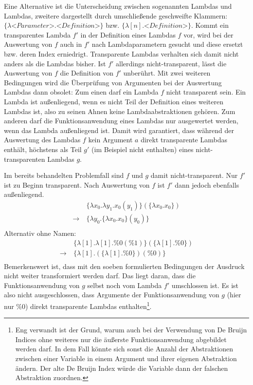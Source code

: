  Eine Alternative ist die Unterscheidung zwischen sogenannten  Lambdas und  Lambdas, zweitere dargestellt durch umschließende geschweifte Klammern: $\{\lambda \textit{<Parameter>}.\textit{<Definition>}\}$ bzw. $\{\lambda [n].\textit{<Definition>}\}$. Kommt ein transparentes Lambda $f'$ in der Definition eines Lambdas $f$ vor, wird bei der Auswertung von $f$ auch in $f'$ nach Lambdaparametern gesucht und diese ersetzt bzw. deren Index erniedrigt. Transparente Lambdas verhalten sich damit nicht anders als die Lambdas bisher. Ist $f'$ allerdings nicht-transparent, lässt die Auswertung von $f$ die Definition von $f'$ unberührt. 
 Mit zwei weiteren Bedingungen wird die Überprüfung von Argumenten bei der Auswertung Lambdas dann obsolet: 
 Zum einen darf ein  Lambda $f$ nicht transparent sein. Ein Lambda ist außenliegend, wenn es nicht Teil der Definition eines weiteren Lambdas ist, also zu seinen Ahnen keine Lambdaabstraktionen gehören. Zum anderen darf die Funktionsanwendung eines Lambdas nur ausgewertet werden, wenn das Lambda außenliegend ist. Damit wird garantiert, dass während der Auswertung des Lambdas $f$ kein Argument $a$ direkt transparente Lambdas enthält, höchstens als Teil $g'$ (im Beispiel nicht enthalten) eines nicht-transparenten Lambdas $g$.

Im bereits behandelten Problemfall sind $f$ und $g$ damit nicht-transparent. Nur $f'$ ist zu Beginn transparent. Nach Auswertung von $f$ ist $f'$ dann jedoch ebenfalls außenliegend.
\begin{align*}
    ~           &~\{\lambda x_0 .\lambda y_1 .x_0(y_1)\}(\{\lambda x_0 .x_0\}) \\
    \rightarrow &~\{\lambda y_0 .\{\lambda x_0 .x_0\}(y_0)\}\\
\end{align*}
Alternativ ohne Namen:
\begin{align*}
    ~           &~\{\lambda [1] .\lambda [1] .\%0(\%1)\}(\{\lambda [1] .\%0\}) \\
    \rightarrow &~\{\lambda [1] .(\{\lambda [1] .\%0\})(\%0)\}\\
\end{align*}
Bemerkenswert ist, dass mit den soeben formulierten Bedingungen der Ausdruck nicht weiter transformiert werden darf. Das liegt daran, dass die Funktionsanwendung von $g$ selbst noch vom Lambda $f'$ umschlossen ist. Es ist also nicht ausgeschlossen, dass Argumente der Funktionsanwendung von $g$ (hier nur $\%0$) direkt transparente Lambdas enthalten\footnote{Eng verwandt ist der Grund, warum auch bei der Verwendung von De Bruijn Indices ohne weiteres nur die äußerste Funktionsanwendung abgebildet werden darf. In dem Fall könnte sich sonst die Anzahl der Abstraktionen zwischen einer Variable in einem Argument und ihrer eigenen Abstraktion ändern. Der alte De Bruijn Index würde die Variable dann der falschen Abstraktion zuordnen.}.




